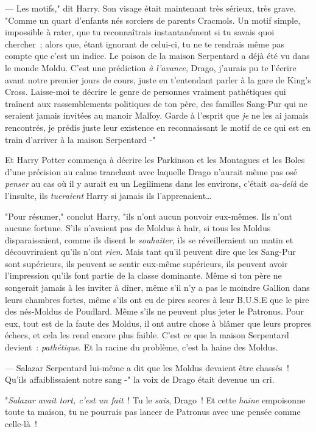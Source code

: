--- Les motifs," dit Harry. Son visage était maintenant très sérieux, très grave. "Comme un quart d'enfants nés sorciers de parents Cracmols. Un motif simple, impossible à rater, que tu reconnaîtrais instantanément si tu savais quoi chercher~; alors que, étant ignorant de celui-ci, tu ne te rendrais même pas compte que c'est un indice. Le poison de la maison Serpentard a déjà été vu dans le monde Moldu. C'est une prédiction \emph{à l'avance}, Drago, j'aurais pu te l'écrire avant notre premier jours de cours, juste en t'entendant parler à la gare de King's Cross. Laisse-moi te décrire le genre de personnes vraiment pathétiques qui traînent aux rassemblements politiques de ton père, des familles Sang-Pur qui ne seraient jamais invitées au manoir Malfoy. Garde à l'esprit que \emph{je} ne les ai jamais rencontrés, je prédis juste leur existence en reconnaissant le motif de ce qui est en train d'arriver à la maison Serpentard -"

Et Harry Potter commença à décrire les Parkinson et les Montagues et les Boles d'une précision au calme tranchant avec laquelle Drago n'aurait même pas osé \emph{penser} au cas où il y aurait eu un Legilimens dans les environs, c'était \emph{au-delà} de l'insulte, ils \emph{tueraient} Harry si jamais ils l'apprenaient…

"Pour résumer," conclut Harry, "ils n'ont aucun pouvoir eux-mêmes. Ils n'ont aucune fortune. S'ils n'avaient pas de Moldus à haïr, si tous les Moldus disparaissaient, comme ils disent le \emph{souhaiter}, ils se réveilleraient un matin et découvriraient qu'ils n'ont \emph{rien}. Mais tant qu'il peuvent dire que les Sang-Pur sont supérieurs, ils peuvent se sentir eux-même supérieurs, ils peuvent avoir l'impression qu'ils font partie de la classe dominante. Même si ton père ne songerait jamais à les inviter à dîner, même s'il n'y a pas le moindre Gallion dans leurs chambres fortes, même s'ils ont eu de pires scores à leur B.U.S.E que le pire des nés-Moldus de Poudlard. Même s'ils ne peuvent plus jeter le Patronus. Pour eux, tout est de la faute des Moldus, il ont autre chose à blâmer que leurs propres échecs, et cela les rend encore plus faible. C'est ce que la maison Serpentard devient~: \emph{pathétique}. Et la racine du problème, c'est la haine des Moldus.

--- Salazar Serpentard lui-même a dit que les Moldus devaient être chassés~! Qu'ils affaiblissaient notre sang -" la voix de Drago était devenue un cri.

"\emph{Salazar avait tort, c'est un fait}~! Tu le \emph{sais}, Drago~! Et cette \emph{haine} empoisonne toute ta maison, tu ne pourrais pas lancer de Patronus avec une pensée comme celle-là~!

